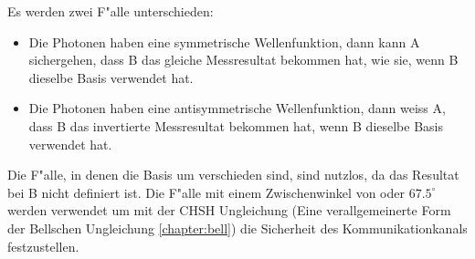   Es werden zwei F"alle unterschieden:
  \begin{itemize}
      \item Die Photonen haben eine symmetrische Wellenfunktion, dann kann A sichergehen, dass B das gleiche Messresultat bekommen hat, wie sie, wenn B dieselbe Basis verwendet hat.
      \item  Die Photonen haben eine antisymmetrische Wellenfunktion, dann weiss A, dass B das invertierte Messresultat bekommen hat, wenn B dieselbe Basis verwendet hat.
  \end{itemize}


  Die F"alle, in denen die Basis um \qcstv verschieden sind, sind nutzlos, da das Resultat bei B nicht definiert ist.
  Die F"alle mit einem Zwischenwinkel von \qcstd oder $67.5^{\circ}$ werden verwendet um mit der CHSH Ungleichung (Eine verallgemeinerte Form der Bellschen Ungleichung \ref{chapter:bell}) die Sicherheit des Kommunikationkanals festzustellen.
